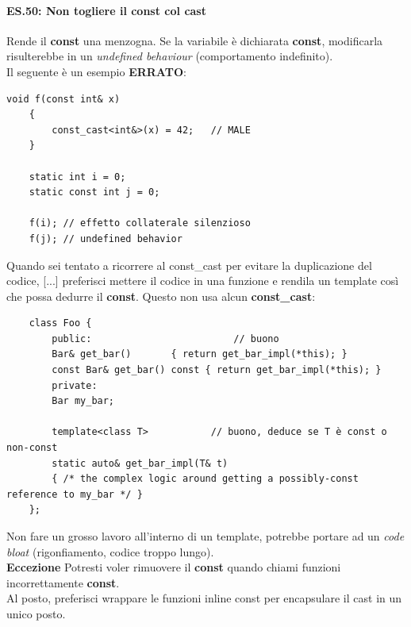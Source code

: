 \paragraph{ES.50: Non togliere il const col cast}

\textsf{\small Rende il \textbf{const} una menzogna. Se la variabile è dichiarata \textbf{const}, modificarla risulterebbe in un \emph{undefined behaviour} (comportamento indefinito).} \\

\textsf{\small Il seguente è un esempio \textbf{\color{red}ERRATO}\normalcolor:}

\begin{lstlisting}[frame=single, rulecolor=\color{red}]
	void f(const int& x)
	{
		const_cast<int&>(x) = 42;   // MALE
	}
	
	static int i = 0;
	static const int j = 0;
	
	f(i); // effetto collaterale silenzioso
	f(j); // undefined behavior
\end{lstlisting}

\textsf{\small Quando sei tentato a ricorrere al const\_cast per evitare la duplicazione del codice, [...] preferisci mettere il codice in una funzione e rendila un template così che possa dedurre il \textbf{const}. Questo non usa alcun \textbf{const\_cast}: }

\begin{lstlisting}
	class Foo {
		public:                         // buono
		Bar& get_bar()       { return get_bar_impl(*this); }
		const Bar& get_bar() const { return get_bar_impl(*this); }
		private:
		Bar my_bar;
		
		template<class T>           // buono, deduce se T è const o non-const
		static auto& get_bar_impl(T& t)
		{ /* the complex logic around getting a possibly-const reference to my_bar */ }
	};
\end{lstlisting}

\textsf{\small Non fare un grosso lavoro all'interno di un template, potrebbe portare ad un \emph{code bloat} (rigonfiamento, codice troppo lungo).} \\ %

\textsf{\small \textbf{Eccezione} Potresti voler rimuovere il \textbf{const} quando chiami funzioni incorrettamente \textbf{const}.} \\ %
\textsf{\small Al posto, preferisci wrappare le funzioni inline const per encapsulare il cast in un unico posto.} \\ %

